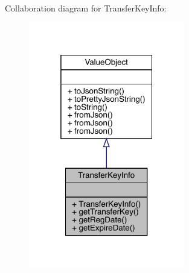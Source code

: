 Collaboration diagram for Transfer\+Key\+Info\+:\nopagebreak
\begin{figure}[H]
\begin{center}
\leavevmode
\includegraphics[width=193pt]{classcom_1_1toast_1_1android_1_1gamebase_1_1auth_1_1data_1_1_transfer_key_info__coll__graph}
\end{center}
\end{figure}

